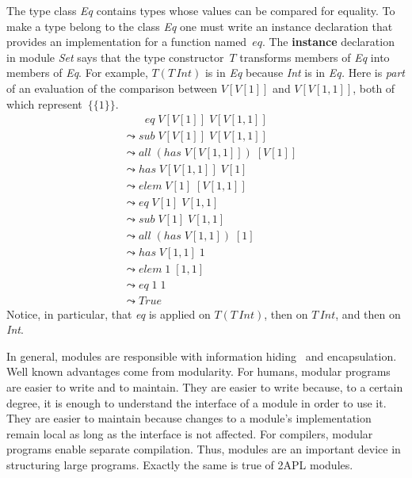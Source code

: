 \documentclass[conference,compsoc]{IEEEtran} %
\begin{document}

The type class \textit{Eq} contains types whose values can be compared for
equality. To make a type belong to the class \textit{Eq} one must write an
instance declaration that provides an implementation for a function
named~$eq$. The \textbf{instance} declaration in module \textit{Set} says
that the type constructor~$T$ transforms members of \textit{Eq} into
members of \textit{Eq}. For example, $T(T\,\mathit{Int})$ is in \textit{Eq}
because \textit{Int} is in \textit{Eq.} Here is \emph{part} of an
evaluation of the comparison between $V[V[1]]$ and $V[V[1,1]]$, both of
which represent~$\{\{1\}\}$.
\begin{align*}
&\phantom{\;\leadsto\;}
  \mathit{eq}\;V[V[1]]\;V[V[1,1]] \\
&\leadsto
  \mathit{sub}\;V[V[1]]\;V[V[1,1]]\\
&\leadsto
  \mathit{all}\;(\mathit{has}\;V[V[1,1]])\;[V[1]]\\
&\leadsto
  \mathit{has}\;V[V[1,1]]\;V[1]\\
&\leadsto
  \mathit{elem}\;V[1]\;[V[1,1]]\\
&\leadsto
  \mathit{eq}\;V[1]\;V[1,1]\\
&\leadsto
  \mathit{sub}\;V[1]\;V[1,1]\\
&\leadsto
  \mathit{all}\;(\mathit{has}\;V[1,1])\;[1]\\
&\leadsto
  \mathit{has}\;V[1,1]\;1 \\
&\leadsto
  \mathit{elem}\;1\;[1,1]\\
&\leadsto
  \mathit{eq}\;1\;1\\
&\leadsto
  \mathit{True}
\end{align*}
Notice, in particular, that \textit{eq} is applied on $T(T\,\mathit{Int})$,
then on $T\,\mathit{Int}$, and then on \textit{Int}.

In general, modules are responsible with information
hiding~\cite{DBLP:journals/cacm/Parnas72a} and encapsulation. Well known
advantages come from modularity. For humans, modular programs are easier to
write and to maintain. They are easier to write because, to a certain
degree, it is enough to understand the interface of a module in order to
use it. They are easier to maintain because changes to a module's
implementation remain local as long as the interface is not affected. For
compilers, modular programs enable separate compilation. Thus, modules are
an important device in structuring large programs. Exactly the same is true
of 2APL modules.
\end{document}

